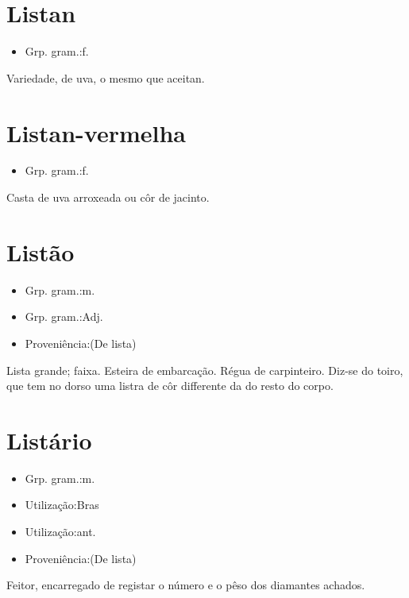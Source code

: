 \section{Listan}
\begin{itemize}
\item {Grp. gram.:f.}
\end{itemize}
Variedade, de uva, o mesmo que \textunderscore aceitan\textunderscore .
\section{Listan-vermelha}
\begin{itemize}
\item {Grp. gram.:f.}
\end{itemize}
Casta de uva arroxeada ou côr de jacinto.
\section{Listão}
\begin{itemize}
\item {Grp. gram.:m.}
\end{itemize}
\begin{itemize}
\item {Grp. gram.:Adj.}
\end{itemize}
\begin{itemize}
\item {Proveniência:(De \textunderscore lista\textunderscore )}
\end{itemize}
Lista grande; faixa.
Esteira de embarcação.
Régua de carpinteiro.
Diz-se do toiro, que tem no dorso uma listra de côr differente da do resto do corpo.
\section{Listário}
\begin{itemize}
\item {Grp. gram.:m.}
\end{itemize}
\begin{itemize}
\item {Utilização:Bras}
\end{itemize}
\begin{itemize}
\item {Utilização:ant.}
\end{itemize}
\begin{itemize}
\item {Proveniência:(De \textunderscore lista\textunderscore )}
\end{itemize}
Feitor, encarregado de registar o número e o pêso dos diamantes achados.
